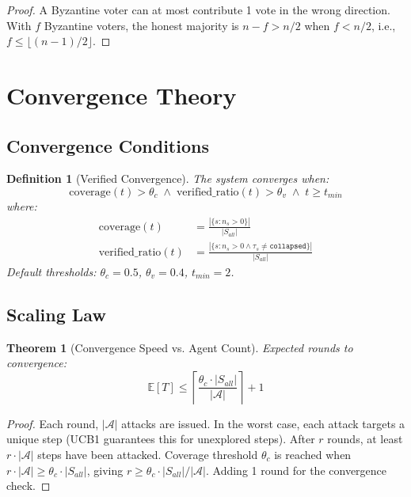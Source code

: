 \documentclass[11pt,a4paper]{article}
\newtheorem{definition}{Definition}
\newtheorem{theorem}{Theorem}
\begin{document}
\begin{proof}
A Byzantine voter can at most contribute 1 vote in the wrong direction. With $f$ Byzantine voters, the honest majority is $n - f > n/2$ when $f < n/2$, i.e., $f \leq \lfloor (n-1)/2 \rfloor$.
\end{proof}

\section{Convergence Theory}

\subsection{Convergence Conditions}

\begin{definition}[Verified Convergence]
The system converges when:
$$\text{coverage}(t) > \theta_c \;\wedge\; \text{verified\_ratio}(t) > \theta_v \;\wedge\; t \geq t_{min}$$
where:
\begin{align}
\text{coverage}(t) &= \frac{|\{s : n_s > 0\}|}{|S_{all}|} \\
\text{verified\_ratio}(t) &= \frac{|\{s : n_s > 0 \wedge \tau_s \neq \texttt{collapsed}\}|}{|S_{all}|}
\end{align}
Default thresholds: $\theta_c = 0.5$, $\theta_v = 0.4$, $t_{min} = 2$.
\end{definition}

\subsection{Scaling Law}

\begin{theorem}[Convergence Speed vs. Agent Count]
Expected rounds to convergence:
$$\mathbb{E}[T] \leq \left\lceil \frac{\theta_c \cdot |S_{all}|}{|\mathcal{A}|} \right\rceil + 1$$
\end{theorem}

\begin{proof}
Each round, $|\mathcal{A}|$ attacks are issued. In the worst case, each attack targets a unique step (UCB1 guarantees this for unexplored steps). After $r$ rounds, at least $r \cdot |\mathcal{A}|$ steps have been attacked. Coverage threshold $\theta_c$ is reached when $r \cdot |\mathcal{A}| \geq \theta_c \cdot |S_{all}|$, giving $r \geq \theta_c \cdot |S_{all}| / |\mathcal{A}|$. Adding 1 round for the convergence check.
\end{proof}
\end{document}
